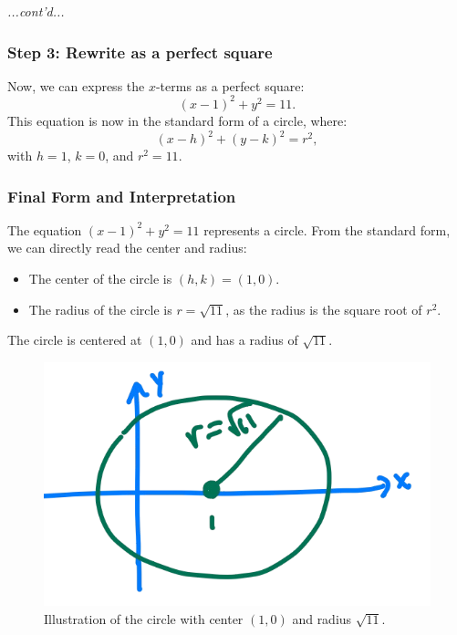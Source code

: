 \documentclass{article}
\begin{document}
\begin{exercisebox}
    \textit{...cont'd...}
    \begin{solutionbox}
        \subsubsection*{Step 3: Rewrite as a perfect square}
        Now, we can express the \(x\)-terms as a perfect square:
        \[
            (x - 1)^2 + y^2 = 11.
        \]
        This equation is now in the standard form of a circle, where:
        \[
            (x - h)^2 + (y - k)^2 = r^2,
        \]
        with \(h = 1\), \(k = 0\), and \(r^2 = 11\).
    
        \subsubsection*{Final Form and Interpretation}
        The equation \((x - 1)^2 + y^2 = 11\) represents a circle. From the standard form, we can directly read the center and radius:
        \begin{itemize}
            \item The center of the circle is \((h, k) = (1, 0)\).
            \item The radius of the circle is \(r = \sqrt{11}\), as the radius is the square root of \(r^2\).
        \end{itemize}
        
        \begin{tipbox}
        The circle is centered at \((1, 0)\) and has a radius of \(\sqrt{11}\).
        \end{tipbox}

        \begin{figure}[H]
            \centering
            \includegraphics[width=.5\textwidth]{equation of a circle example question.png}
            \caption{Illustration of the circle with center \( (1, 0) \) and radius \( \sqrt{11} \).}
            \label{fig:circle_example}
        \end{figure}        
    \end{solutionbox}
\end{exercisebox}
\end{document}
